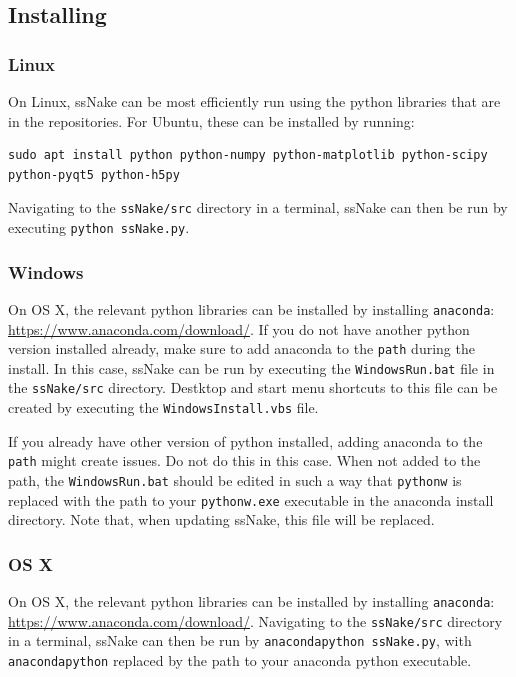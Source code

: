 \documentclass[11pt,a4paper]{article}
\begin{document}
\subsection{Installing}
\subsubsection{Linux}
On Linux, ssNake can be most efficiently run using the python libraries that are in the
repositories. For Ubuntu, these can be installed by running:
\begin{verbatim}
sudo apt install python python-numpy python-matplotlib python-scipy
python-pyqt5 python-h5py
\end{verbatim}
Navigating to the \texttt{ssNake/src} directory in a terminal, ssNake can then be run
by executing \texttt{python ssNake.py}.

\subsubsection{Windows}
On OS X, the relevant python libraries can be installed by installing \texttt{anaconda}:
\url{https://www.anaconda.com/download/}. If you do not have another python version installed
already, make sure to add anaconda to the \texttt{path} during the install. In this case, ssNake can
be run by executing the \texttt{WindowsRun.bat} file in the \texttt{ssNake/src} directory. Destktop
and start menu shortcuts to this file can be created by executing the \texttt{WindowsInstall.vbs}
file.

If you already have other version of python installed, adding anaconda to the \texttt{path} might
create issues. Do not do this in this case. When not added to the path, the \texttt{WindowsRun.bat}
should be edited in such a way that \texttt{pythonw} is replaced with the path to your
\texttt{pythonw.exe} executable in the anaconda install directory. Note that, when updating ssNake,
this file will be replaced.

\subsubsection{OS X}
On OS X, the relevant python libraries can be installed by installing \texttt{anaconda}:
\url{https://www.anaconda.com/download/}. Navigating to the \texttt{ssNake/src} directory in a terminal, ssNake can then be run
by \texttt{anacondapython ssNake.py}, with \texttt{anacondapython} replaced by the path to your
anaconda python executable.
\end{document}
